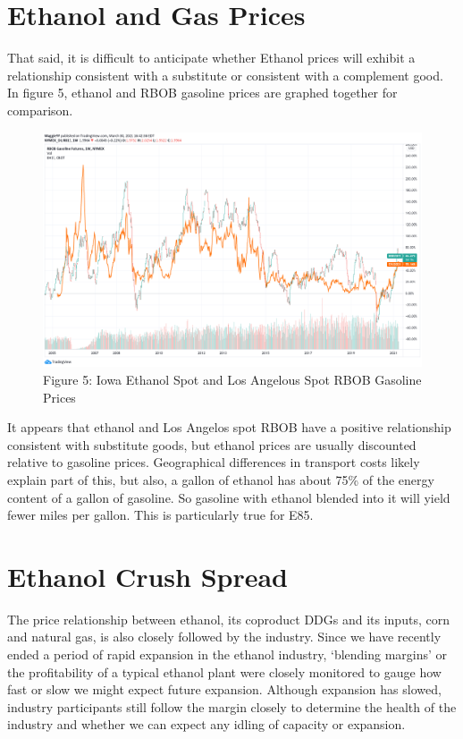 \documentclass[
  letterpaper,
  DIV=11,
  numbers=noendperiod]{scrreprt}
\begin{document}
\section{Ethanol and Gas Prices}\label{ethanol-and-gas-prices}

That said, it is difficult to anticipate whether Ethanol prices will
exhibit a relationship consistent with a substitute or consistent with a
complement good. In figure 5, ethanol and RBOB gasoline prices are
graphed together for comparison.

\begin{figure}[H]

{\centering \includegraphics{assets/EthRBOB.png}

}

\caption{Figure 5: Iowa Ethanol Spot and Los Angelous Spot RBOB Gasoline
Prices}

\end{figure}%

It appears that ethanol and Los Angelos spot RBOB have a positive
relationship consistent with substitute goods, but ethanol prices are
usually discounted relative to gasoline prices. Geographical differences
in transport costs likely explain part of this, but also, a gallon of
ethanol has about 75\% of the energy content of a gallon of gasoline. So
gasoline with ethanol blended into it will yield fewer miles per gallon.
This is particularly true for E85.

\section{Ethanol Crush Spread}\label{ethanol-crush-spread}

The price relationship between ethanol, its coproduct DDGs and its
inputs, corn and natural gas, is also closely followed by the industry.
Since we have recently ended a period of rapid expansion in the ethanol
industry, `blending margins' or the profitability of a typical ethanol
plant were closely monitored to gauge how fast or slow we might expect
future expansion. Although expansion has slowed, industry participants
still follow the margin closely to determine the health of the industry
and whether we can expect any idling of capacity or expansion.
\end{document}
